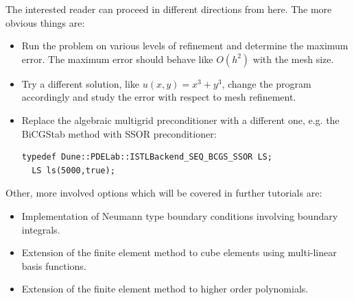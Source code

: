 \documentclass[a4paper,12pt]{article}
\begin{document}
The interested reader can proceed in different directions from here.
The more obvious things are:
\begin{itemize}
\item Run the problem on various levels of refinement and determine
the maximum error. The maximum error should behave like $O(h^2)$
with the mesh size.
\item Try a different solution, like $u(x,y)=x^3+y^3$, change the program
accordingly and study the error with respect to mesh refinement.
\item Replace the algebraic multigrid preconditioner with a different one,
e.g. the BiCGStab method with SSOR preconditioner:
\begin{lstlisting}[basicstyle=\ttfamily\small,
frame=single,
backgroundcolor=\color{listingbg}]
  typedef Dune::PDELab::ISTLBackend_SEQ_BCGS_SSOR LS;
  LS ls(5000,true);
\end{lstlisting}
\end{itemize}
Other, more involved options which will be covered in further tutorials are:
\begin{itemize}
\item Implementation of Neumann type boundary conditions involving
boundary integrals.
\item Extension of the finite element method to cube elements using 
multi-linear basis functions.
\item Extension of the finite element method to higher order polynomials.
\end{itemize}



\end{document}
